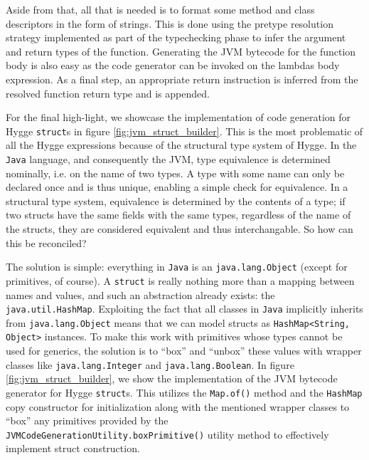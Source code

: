 Aside from that, all that is needed is to format some method and class descriptors in the form of strings. This is done using the pretype resolution strategy
implemented as part of the typechecking phase to infer the argument and return types of the function. Generating the JVM bytecode for the function
body is also easy as the code generator can be invoked on the lambdas body expression. As a final step, an appropriate return instruction is inferred
from the resolved function return type and is appended.

For the final high-light, we showcase the implementation of code generation for Hygge \texttt{struct}s in figure \ref{fig:jvm_struct_builder}.
This is the most problematic of all the Hygge expressions because of the structural type system of Hygge. In the \texttt{Java} language, and consequently the JVM,
type equivalence is determined nominally, i.e. on the name of two types. A type with some name can only be declared once and is thus unique, enabling
a simple check for equivalence. In a structural type system, equivalence is determined by the contents of a type; if two structs have the same fields with
the same types, regardless of the name of the structs, they are considered equivalent and thus interchangable. So how can this be reconciled?

The solution is simple: everything in \texttt{Java} is an \texttt{java.lang.Object} (except for primitives, of course). A \texttt{struct} is really
nothing more than a mapping between names and values, and such an abstraction already exists: the \texttt{java.util.HashMap}.
Exploiting the fact that all classes in \texttt{Java} implicitly inherits from \texttt{java.lang.Object} means that we can
model structs as \texttt{HashMap<String, Object>} instances. To make this work with primitives whose types cannot be used for generics,
the solution is to ``box'' and ``unbox'' these values with wrapper classes like \texttt{java.lang.Integer} and \texttt{java.lang.Boolean}.
In figure \ref{fig:jvm_struct_builder}, we show the implementation of the JVM bytecode generator for Hygge \texttt{struct}s. This utilizes the \texttt{Map.of()}
method and the \texttt{HashMap} copy constructor for initialization along with the mentioned wrapper classes to ``box''
any primitives provided by the \texttt{JVMCodeGenerationUtility.boxPrimitive()} utility method to effectively implement
struct construction.

